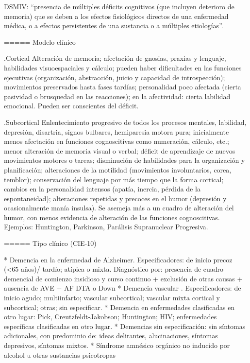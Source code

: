 \documentclass[encares.tex]{subfiles}
\begin{document}
DSMIV: “presencia de múltiples déficits cognitivos (que incluyen deterioro de memoria) que se deben a los efectos fisiológicos directos de una enfermedad médica, o a efectos persistentes de una sustancia o a múltiples etiologías”.

===== Modelo clínico

.Cortical
Alteración de memoria; afectación de gnosias, praxias y lenguaje, habilidades visuoespaciales y cálculo; pueden haber dificultades en las funciones ejecutivas (organización, abstracción, juicio y capacidad de introspección); movimientos preservados hasta fases tardías; personalidad poco afectada (cierta pasividad o brusquedad en las reacciones); en la afectividad: cierta labilidad emocional. Pueden ser conscientes del déficit.

.Subcortical
Enlentecimiento progresivo de todos los procesos mentales, labilidad, depresión, disartria, signos bulbares, hemiparesia motora pura; inicialmente menos afectación en funciones cognoscitivas como numeración, cálculo, etc.; menor alteración de memoria visual o verbal; déficit de aprendizaje de nuevos movimientos motores o tareas; disminución de habilidades para la organización y planificación; alteraciones de la motilidad (movimientos involuntarios, corea, temblor); conservación del lenguaje por más tiempo que la forma cortical; cambios en la personalidad intensos (apatía, inercia, pérdida de la espontaneidad); alteraciones repetidas y precoces en el humor (depresión y ocasionalmente manía insulsa). Se asemeja más a un cuadro de alteración del humor, con menos evidencia de alteración de las funciones cognoscitivas. Ejemplos: Huntington, Parkinson, Parálisis Supranuclear Progresiva.

===== Tipo clínico (CIE-10)

* Demencia en la enfermedad de Alzheimer. Especificadores: de inicio precoz (<65 años)/ tardío; atípica o mixta. Diagnóstico por: presencia de cuadro demencial de comienzo insidioso y curso continuo + exclusión de otras causas + ausencia de AVE + AF DTA o Down
* Demencia vascular . Especificadores: de inicio agudo; multiinfarto; vascular subcortical; vascular mixta cortical y subcortical; otras; sin especificar.
* Demencia en enfermedades clasificadas en otro lugar: Pick, Creutzfeldt-Jakobson; Huntington; HIV; enfermedades específicas clasificadas en otro lugar.
* Demencias sin especificación: sin síntomas adicionales, con predominio de: ideas delirantes, alucinaciones, síntomas depresivos, síntomas mixtos.
* Síndrome amnésico orgánico no inducido por alcohol u otras sustancias psicotropas
\end{document}
